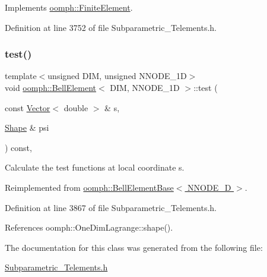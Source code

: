 Implements \hyperlink{classoomph_1_1FiniteElement_a58a25b6859ddd43b7bfe64a19fee5023}{oomph\+::\+Finite\+Element}.



Definition at line 3752 of file Subparametric\+\_\+\+Telements.\+h.

\mbox{\label{classoomph_1_1BellElement_a99afdb504fee71cb9c557ecb5069cd95}} 
\subsubsection{\texorpdfstring{test()}{test()}}
{\footnotesize\ttfamily template$<$unsigned D\+IM, unsigned N\+N\+O\+D\+E\+\_\+1D$>$ \\
void \hyperlink{classoomph_1_1BellElement}{oomph\+::\+Bell\+Element}$<$ D\+IM, N\+N\+O\+D\+E\+\_\+1D $>$\+::test (\begin{DoxyParamCaption}\item[{const \hyperlink{classoomph_1_1Vector}{Vector}$<$ double $>$ \&}]{s,  }\item[{\hyperlink{classoomph_1_1Shape}{Shape} \&}]{psi }\end{DoxyParamCaption}) const\hspace{0.3cm}{\ttfamily [inline]}, {\ttfamily [virtual]}}



Calculate the test functions at local coordinate s. 



Reimplemented from \hyperlink{classoomph_1_1BellElementBase_a76ddb90394c979f9967e8fd068bdf220}{oomph\+::\+Bell\+Element\+Base$<$ N\+N\+O\+D\+E\+\_\+D $>$}.



Definition at line 3867 of file Subparametric\+\_\+\+Telements.\+h.



References oomph\+::\+One\+Dim\+Lagrange\+::shape().



The documentation for this class was generated from the following file\+:\begin{DoxyCompactItemize}
\item 
\hyperlink{Subparametric__Telements_8h}{Subparametric\+\_\+\+Telements.\+h}\end{DoxyCompactItemize}
